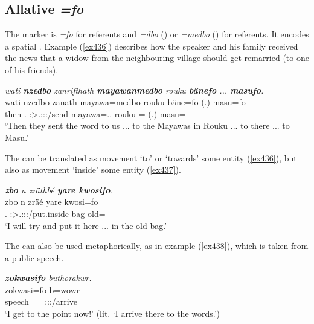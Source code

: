 \subsection{Allative \emph{=fo}} \label{allativecase}

The   marker is \emph{=fo} for  referents and \emph{=dbo} (\Sg) or \emph{=medbo} (\Nsg) for  referents. It encodes a spatial . Example (\ref{ex436}) describes how the speaker and his family received the news that a widow from the neighbouring village should get remarried (to one of his friends). 

\begin{exe}
	\ex \emph{wati \textbf{nzedbo} zanrifthath \textbf{mayawanmedbo} rouku \textbf{bänefo} ... \textbf{masufo}.}\\
	\gll wati nzedbo zanath mayawa=medbo rouku bäne=fo (.) masu=fo\\
	then \Fnsg.{\All} \Stpl:\Sbj>\Tsg.\F:\Obj:\Pst:\Pfv/send mayawa=\All.\Anim.{\Nsg} rouku \Recog={\All} (.) masu={\All}\\
	\trans `Then they sent the word to us ... to the Mayawas in Rouku ... to there ... to Masu.'\\
	\label{ex436}
\end{exe}
	 
The  can be translated as movement `to' or `towards' some entity (\ref{ex436}), but also as movement `inside' some entity (\ref{ex437}).

\begin{exe}
	\ex \emph{\textbf{zbo} n zräthbé \textbf{yare kwosifo}.}\\
	\gll zbo n zräé yare kwosi=fo\\
	\Prox.{\All} {\Imn} \Fsg:\Sbj>\Tsg.\F:\Obj:\Irr:\Pfv/put.inside bag old={\All}\\
	\trans `I will try and put it here ... in the old bag.'
	\label{ex437}
\end{exe}

The  can also be used metaphorically, as in example (\ref{ex438}), which is taken from a public speech.
	
\begin{exe}
	\ex \emph{\textbf{zokwasifo} buthorakwr.}\\
	\gll zokwasi=fo b=wowr\\
	speech={\All} \Med=\Fsg:\Sbj:\Nonpast:\Ipfv/arrive\\
	\trans `I get to the point now!' (lit. `I arrive there to the words.')
	\label{ex438}
\end{exe}

